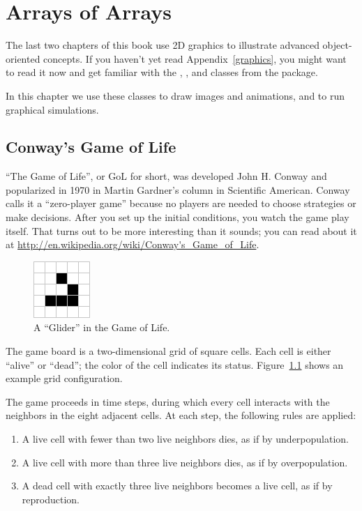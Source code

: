 \chapter{Arrays of Arrays}
\label{conway}

The last two chapters of this book use 2D graphics to illustrate advanced object-oriented concepts.
If you haven't yet read Appendix~\ref{graphics}, you might want to read it now and get familiar with the , , and  classes from the  package.

In this chapter we use these classes to draw images and animations, and to run graphical simulations.


\section{Conway's Game of Life}

``The Game of Life'', or GoL for short, was developed John H. Conway and popularized in 1970 in Martin Gardner’s column in Scientific American.
Conway calls it a ``zero-player game'' because no players are needed to choose strategies or make decisions.
After you set up the initial conditions, you watch the game play itself.
That turns out to be more interesting than it sounds; you can read about it at \url{http://en.wikipedia.org/wiki/Conway's_Game_of_Life}.

\begin{figure}[!ht]
\begin{center}
\includegraphics{figs/glider.png}
\caption{A ``Glider'' in the Game of Life.}
\label{fig:glider}
\end{center}
\end{figure}

The game board is a two-dimensional grid of square cells.
Each cell is either ``alive'' or ``dead''; the color of the cell indicates its status.
Figure~\ref{fig:glider} shows an example grid configuration.


The game proceeds in time steps, during which every cell interacts with the neighbors in the eight adjacent cells.
At each step, the following rules are applied:

\begin{enumerate}
\item A live cell with fewer than two live neighbors dies, as if by underpopulation.
\item A live cell with more than three live neighbors dies, as if by overpopulation.
\item A dead cell with exactly three live neighbors becomes a live cell, as if by reproduction.
\end{enumerate}

